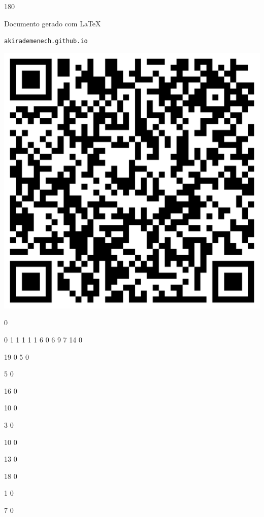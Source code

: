 \documentclass[12pt]{article}
\begin{document}
	\begin{turn}{180}	
		\begin{minipage}{\textwidth}		  
		  Documento gerado com \LaTeX			
		  
		  \texttt{akirademenech.github.io}

		  \includegraphics[height=0.3\textheight]{2e-2.pdf}

		\end{minipage}	
	\end{turn}  
		  
		\vfill  
		  
{
	0	%

	0	%
	1	%
	1	%
	1	%
	1	%
	1	%
	6	%
	0	%
	6	%
	9	%
	7	%
	14	%
	0	%

	19	%
	0	%
	5	%
	0	%

	5	%
	0	%

	16	%
	0	%

	10	%
	0	%

	3	%
	0	%

	10	%
	0	%

	13	%
	0	%

	18	%
	0	%

	1	%
	0	%

	7	%
	0	%

}	  
		    	
\end{document}
